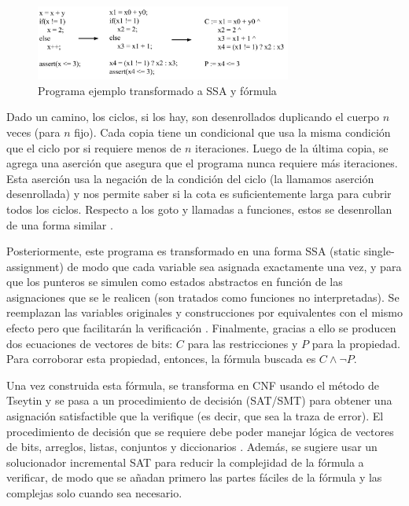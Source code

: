 \documentclass[runningheads]{llncs}
\begin{document}
\begin{figure}[!htb]
  \centering
  \includegraphics[width=0.75\textwidth]{code-conversion.jpg}
  \caption{Programa ejemplo transformado a SSA y fórmula}
  \label{fig: code-conversion}
\end{figure}

Dado un camino, los ciclos, si los hay, son desenrollados duplicando el cuerpo $n$ veces (para $n$ fijo).
Cada copia tiene un condicional que usa la misma condición que el ciclo por si requiere menos de $n$ iteraciones.
Luego de la última copia, se agrega una aserción que asegura que el programa nunca requiere más iteraciones.
Esta aserción usa la negación de la condición del ciclo (la llamamos aserción desenrollada) y nos permite saber si la cota es suficientemente larga para cubrir todos los ciclos.
Respecto a los goto y llamadas a funciones, estos se desenrollan de una forma similar \cite{tacas-2004}.

Posteriormente, este programa es transformado en una forma SSA (static single-assignment) de modo que cada variable sea asignada exactamente una vez, y para que 
los punteros se simulen como estados abstractos en función de las asignaciones que se le realicen (son tratados como funciones no interpretadas).
Se reemplazan las variables originales y construcciones por equivalentes con el mismo efecto pero que facilitarán la verificación \cite{cbmc-slides}.
Finalmente, gracias a ello se producen dos ecuaciones de vectores de bits: $C$ para las restricciones y $P$ para la propiedad.
Para corroborar esta propiedad, entonces, la fórmula buscada es $C \land \neg P$.

Una vez construida esta fórmula, se transforma en CNF usando el método de Tseytin y se pasa a un procedimiento de decisión (SAT/SMT) para obtener una asignación 
satisfactible que la verifique (es decir, que sea la traza de error).
El procedimiento de decisión que se requiere debe poder manejar lógica de vectores de bits, arreglos, listas, conjuntos y diccionarios \cite{cbmc-slides}.
Además, se sugiere usar un solucionador incremental SAT para reducir la complejidad de la fórmula a verificar, de modo que se añadan primero las partes fáciles 
de la fórmula y las complejas solo cuando sea necesario.
\end{document}
